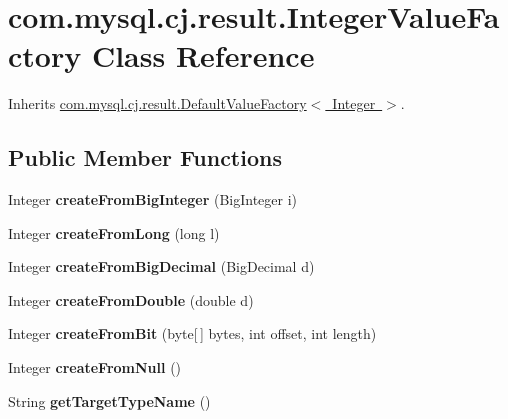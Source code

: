 \hypertarget{classcom_1_1mysql_1_1cj_1_1result_1_1_integer_value_factory}{}\section{com.\+mysql.\+cj.\+result.\+Integer\+Value\+Factory Class Reference}
\label{classcom_1_1mysql_1_1cj_1_1result_1_1_integer_value_factory}


Inherits \mbox{\hyperlink{classcom_1_1mysql_1_1cj_1_1result_1_1_default_value_factory}{com.\+mysql.\+cj.\+result.\+Default\+Value\+Factory$<$ Integer $>$}}.

\subsection*{Public Member Functions}
\begin{DoxyCompactItemize}
\item 
\mbox{\label{classcom_1_1mysql_1_1cj_1_1result_1_1_integer_value_factory_afcaad654d1c819a9d5cb95702e462f13}} 
Integer {\bfseries create\+From\+Big\+Integer} (Big\+Integer i)
\item 
\mbox{\label{classcom_1_1mysql_1_1cj_1_1result_1_1_integer_value_factory_a3336f8086f9c6f0dd4b646ee02dea5b0}} 
Integer {\bfseries create\+From\+Long} (long l)
\item 
\mbox{\label{classcom_1_1mysql_1_1cj_1_1result_1_1_integer_value_factory_a6ba94e37c3fb2dd979ac41eb1707b95a}} 
Integer {\bfseries create\+From\+Big\+Decimal} (Big\+Decimal d)
\item 
\mbox{\label{classcom_1_1mysql_1_1cj_1_1result_1_1_integer_value_factory_adb315fc6e975bb8daf76d5aa0c34a8f6}} 
Integer {\bfseries create\+From\+Double} (double d)
\item 
\mbox{\label{classcom_1_1mysql_1_1cj_1_1result_1_1_integer_value_factory_ae388febb5e85b19f21ef5ba7527f038e}} 
Integer {\bfseries create\+From\+Bit} (byte\mbox{[}$\,$\mbox{]} bytes, int offset, int length)
\item 
\mbox{\label{classcom_1_1mysql_1_1cj_1_1result_1_1_integer_value_factory_a1192fb5fbb0450406e0f1c68cf9f24a6}} 
Integer {\bfseries create\+From\+Null} ()
\item 
\mbox{\label{classcom_1_1mysql_1_1cj_1_1result_1_1_integer_value_factory_a74ecafb69f253e4d3dc3cb0eab5a3efc}} 
String {\bfseries get\+Target\+Type\+Name} ()
\end{DoxyCompactItemize}


